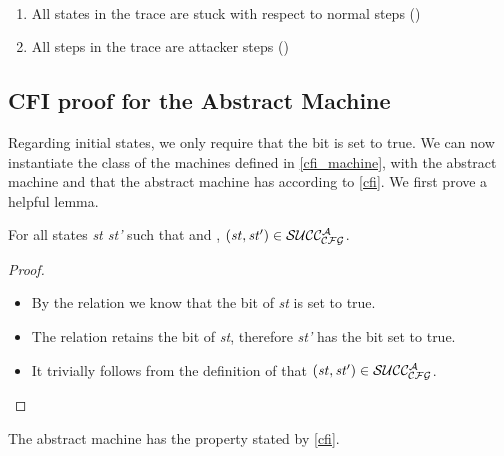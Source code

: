 \begin{definition}
\label{abstract_stopping}
~
\begin{enumerate}
\item All states in the trace are stuck with respect to normal steps
  (\stepn{}{})
\item All steps in the trace are attacker steps (\stepa{}{}{})
\end{enumerate}
\end{definition}

\subsection{CFI proof for the Abstract Machine}\label{abstract_proof}

Regarding initial states, we only require that the \ok bit is set to true.
We can now instantiate the class of the machines defined in
\cref{cfi_machine}, with the abstract machine and that the abstract machine
has \CFI according to \cref{cfi}.
We first prove a helpful lemma.

\begin{lemma}
\label{attacker_no_v}
For all states \textit{st st'} such that 
and , $(\mathit{st},\mathit{st'}) \in \mathcal{SUCC_\mathcal{CFG}^{A}}$.
\end{lemma}

\begin{proof}
~
\begin{itemize}
\item By the relation  we know that the \ok bit
of \textit{st} is set to true.
\item The relation  retains the \ok bit of
\textit{st}, therefore \textit{st'} has the \ok bit set to true.
\item It trivially follows from the definition of  that
$(\mathit{st},\mathit{st'}) \in \mathcal{SUCC_\mathcal{CFG}^{A}}$.
\end{itemize}
\end{proof}

\begin{theorem}\label{CFIabstract}
The abstract machine has the \CFI property stated by \cref{cfi}.
\end{theorem}

